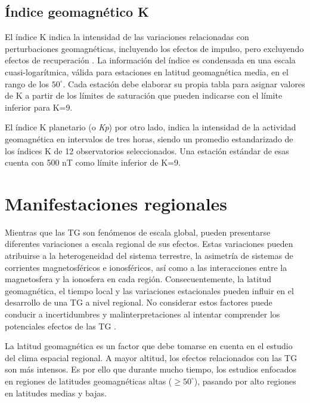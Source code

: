 \subsection{Índice geomagnético K}

El índice K indica la intensidad de las variaciones relacionadas con perturbaciones geomagnéticas, incluyendo los efectos de impulso, pero excluyendo efectos de recuperación \cite{BARTELS_kp}. La información del índice es condensada en una escala cuasi-logarítmica, válida para estaciones en latitud geomagnética media, en el rango de los $50^\circ$. Cada estación debe elaborar su propia tabla para asignar valores de K a partir de los límites de saturación que pueden indicarse con el límite inferior para K=9. 
\vspace{1 em}

El índice K planetario (o \emph{Kp}) por otro lado, indica la intensidad de la actividad geomagnética en intervalos de tres horas, siendo un promedio estandarizado de los índices K de 12 observatorios seleccionados. Una estación estándar de esas cuenta con 500 nT como límite inferior de K=9.

\section{Manifestaciones regionales}

Mientras que las TG son fenómenos de escala global, pueden presentarse diferentes variaciones a escala regional de sus efectos. Estas variaciones pueden atribuirse a la heterogeneidad del sistema terrestre, la asimetría de sistemas de corrientes magnetosféricos e ionosféricos, así como a las interacciones entre la magnetosfera y la ionosfera en cada región. Consecuentemente, la latitud geomagnética, el tiempo local y las variaciones estacionales pueden influir en el desarrollo de una TG a nivel regional. No considerar estos factores puede conducir a incertidumbres y malinterpretaciones al intentar comprender los potenciales efectos de las TG \parencite{gic_intro, gic, gic_2, gic_brazil}.  
\vspace{1 em}

La latitud geomagnética es un factor que debe tomarse en cuenta en el estudio del clima espacial regional. A mayor altitud, los efectos relacionados con las TG son más intensos. Es por ello que durante mucho tiempo, los estudios enfocados en regiones de latitudes geomagnéticas altas ($\ge 50^{\circ}$), pasando por alto regiones en latitudes medias y bajas.
\vspace{1 em}

